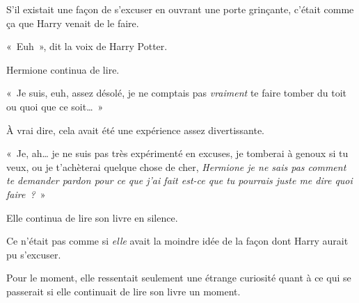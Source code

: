 S'il existait une façon de s'excuser en ouvrant une porte grinçante, c'était comme ça que Harry venait de le faire.

«~Euh~», dit la voix de Harry Potter.

Hermione continua de lire.

«~Je suis, euh, assez désolé, je ne comptais pas \emph{vraiment} te faire tomber du toit ou quoi que ce soit…~»

À vrai dire, cela avait été une expérience assez divertissante.

«~Je, ah… je ne suis pas très expérimenté en excuses, je tomberai à genoux si tu veux, ou je t'achèterai quelque chose de cher, \emph{Hermione je ne sais pas comment te demander pardon pour ce que j'ai fait est-ce que tu pourrais juste me dire quoi faire~?}~»

Elle continua de lire son livre en silence.

Ce n'était pas comme si \emph{elle} avait la moindre idée de la façon dont Harry aurait pu s'excuser.

Pour le moment, elle ressentait seulement une étrange curiosité quant à ce qui se passerait si elle continuait de lire son livre un moment.
